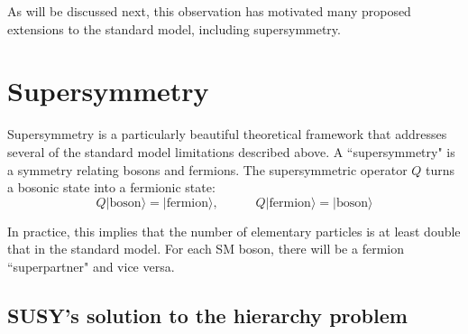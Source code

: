 As will be discussed next, this observation has motivated many proposed extensions to the standard model, including supersymmetry.







\section{Supersymmetry}
\label{sec:SUSY}

Supersymmetry is a particularly beautiful theoretical framework that addresses several of the standard model limitations described above. A ``supersymmetry" is a symmetry relating bosons and fermions. The supersymmetric operator $Q$ turns a bosonic state into a fermionic state:
\begin{equation}
Q|\mathrm{boson}\rangle = |\mathrm{fermion}\rangle, \hspace{35pt} Q|\mathrm{fermion}\rangle = |\mathrm{boson}\rangle
\end{equation}

In practice, this implies that the number of elementary particles is at least double that in the standard model. For each SM boson, there will be a fermion ``superpartner" and vice versa. 

\subsection{SUSY's solution to the hierarchy problem}
\label{sec:SUSYhierarchy}

